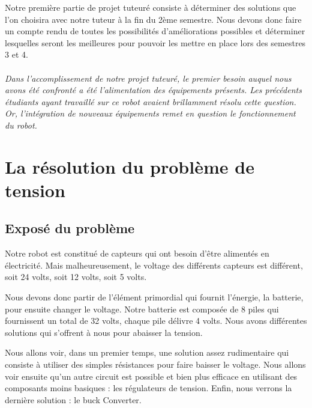 \documentclass{PackagerQualityN}
\begin{document}
Notre première partie de projet tuteuré consiste à déterminer des solutions que l’on choisira avec notre tuteur à la fin du 2ème semestre.
Nous devons donc faire un compte rendu de toutes les possibilités d’améliorations possibles et déterminer lesquelles seront les meilleures pour pouvoir les mettre en place lors des semestres 3 et 4.


\newp       %
\paragraph{}
\textit{Dans l’accomplissement de notre projet tuteuré, le premier besoin auquel nous avons été confronté a été l'alimentation des équipements présents. Les précédents étudiants ayant travaillé sur ce robot avaient brillamment résolu cette question.
Or, l’intégration de nouveaux équipements remet en question le fonctionnement du robot.}




\section{La résolution du problème de tension}



\subsection{Exposé du problème}
Notre robot est constitué de capteurs qui ont besoin d’être alimentés en électricité. Mais malheureusement, le voltage des différents capteurs est différent, soit 24 volts, soit 12 volts, soit 5 volts.

Nous devons donc partir de l’élément primordial qui fournit l’énergie, la batterie, pour ensuite changer le voltage. Notre batterie est composée de 8 piles qui fournissent un total de 32 volts, chaque pile délivre 4 volts.
Nous avons différentes solutions qui s’offrent à nous pour abaisser la tension.

Nous allons voir, dans un premier temps, une solution assez rudimentaire qui consiste à utiliser des simples résistances pour faire baisser le voltage.
Nous allons voir ensuite qu'un autre circuit est possible et bien plus efficace en utilisant des composants moins basiques : les régulateurs de tension.
Enfin, nous verrons la dernière solution : le buck Converter.
\end{document}
